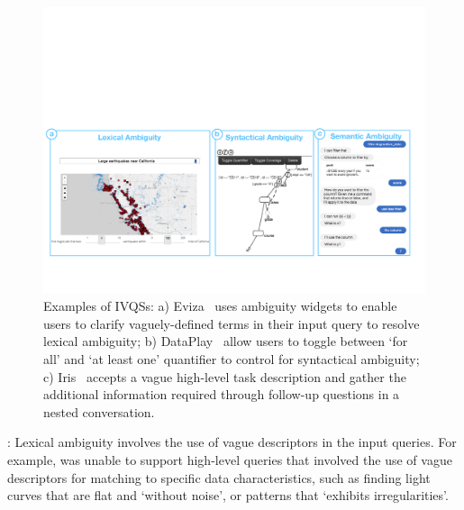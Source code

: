 \begin{figure}[h!]
\centering
\includegraphics[width=\textwidth]{figures/ambiguity.pdf}
\caption{Examples of IVQSs: a) Eviza~\cite{Setlur2016} uses ambiguity widgets to enable users to clarify vaguely-defined terms in their input query to resolve lexical ambiguity; b) DataPlay~\cite{Abouzied2012} allow users to toggle between `for all' and `at least one' quantifier to control for syntactical ambiguity; c) Iris~\cite{Fast2018} accepts a vague high-level task description and gather the additional information required through follow-up questions in a nested conversation.
}
\label{fig:ambiguity}
\end{figure}
: Lexical ambiguity involves the use of vague descriptors in the input queries. For example, \zv was unable to support high-level queries that involved the use of vague descriptors for matching to specific data characteristics, such as finding light curves that are flat and `without noise', or patterns that `exhibits irregularities'. %

